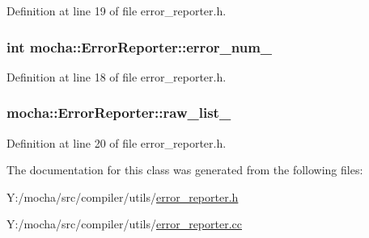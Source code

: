 Definition at line 19 of file error\_\-reporter.h.

\hypertarget{classmocha_1_1_error_reporter_a8aa6147cd385f0230d2494de81647dc0}{
\subsubsection[{error\_\-num\_\-}]{\setlength{\rightskip}{0pt plus 5cm}int {\bf mocha::ErrorReporter::error\_\-num\_\-}}}
\label{classmocha_1_1_error_reporter_a8aa6147cd385f0230d2494de81647dc0}


Definition at line 18 of file error\_\-reporter.h.

\hypertarget{classmocha_1_1_error_reporter_a2abeeebfe1d102c1fc32aaf2df36277e}{
\subsubsection[{raw\_\-list\_\-}]{ {\bf mocha::ErrorReporter::raw\_\-list\_\-}}}
\label{classmocha_1_1_error_reporter_a2abeeebfe1d102c1fc32aaf2df36277e}


Definition at line 20 of file error\_\-reporter.h.



The documentation for this class was generated from the following files:\begin{DoxyCompactItemize}
\item 
Y:/mocha/src/compiler/utils/\hyperlink{error__reporter_8h}{error\_\-reporter.h}\item 
Y:/mocha/src/compiler/utils/\hyperlink{error__reporter_8cc}{error\_\-reporter.cc}\end{DoxyCompactItemize}
